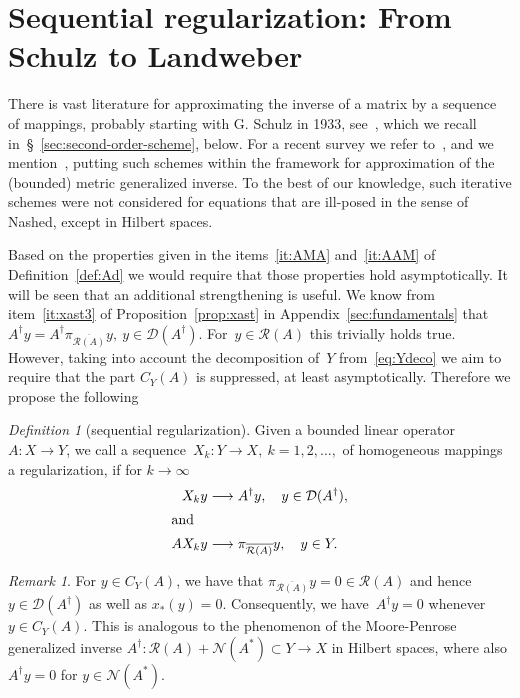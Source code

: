 \documentclass[12pt]{amsart}
\newcommand{\domain}{\mathcal D}
\newcommand{\range}{\mathcal R}
\newcommand{\N}{\mathcal N}
\newcommand{\Ad}{A^\dag}
\newcommand{\xast}{x_\ast}
\newcommand{\pr}{\pi_{\overline{\range(A)}}}
\theoremstyle{remark}
\newtheorem{remark}{Remark}
\newtheorem{definition}{Definition}
\begin{document}
\section{Sequential regularization: From Schulz to Landweber}
\label{sec:regularization}


There is vast literature for approximating the inverse of a matrix by
a sequence of mappings, probably starting with G. Schulz in 1933,
see~\cite{https://doi.org/10.1002/zamm.19330130111}, which we recall
in~\S~\ref{sec:second-order-scheme}, below. For a recent survey we refer to~\cite{MR3969100}, and  we mention~\cite{MR5022356}, putting such schemes within the framework for approximation of the (bounded) metric generalized inverse.
To the best of our knowledge, such iterative
schemes were not considered for equations that are ill-posed in the sense of Nashed, except in Hilbert spaces.
\par
Based on the
properties given in the items~\eqref{it:AMA} and~\eqref{it:AAM} of Definition~\ref{def:Ad} we
would require that those properties hold
asymptotically. It will be seen that an additional strengthening is
useful. We know from item~\eqref{it:xast3} of Proposition~\ref{prop:xast} 
in Appendix~\ref{sec:fundamentals} that~$\Ad y =
\Ad \pr y,\ y\in\domain(\Ad)$. For~$y\in\range(A)$ this trivially
holds true. However, taking into account the decomposition of~$Y$
from~\eqref{eq:Ydeco} we aim to require that the part
$C_Y(A)$ is suppressed, at least asymptotically.
Therefore we propose the following
\begin{definition}[sequential regularization]\label{def:seq-reg}
  Given a bounded linear operator~$A\colon X \to Y$, we call a
  sequence~$X_{k}\colon Y \to X,\ k=1,2,\dots,$  of homogeneous mappings a regularization, if for $k \to \infty$
  \begin{align}
   X_{k}y &\longrightarrow \Ad y,\quad y\in \domain(\Ad)\label{it:VkA},\\
  \intertext{and}  A X_{k}y &\longrightarrow  \pr y,\quad y\in Y\label{it:AVk}.
  \end{align}
\end{definition}

\begin{remark}\label{rem:CYA}
For $y\in C_Y(A)$, we have that $\pr y=0 \in \range(A)$ and hence $y \in \domain(A^\dagger)$ as well as $\xast(y)=0$. Consequently, we have~$\Ad y =0$ whenever~$y\in C_Y(A)$. This is analogous to the phenomenon of the Moore-Penrose generalized inverse 
$\Ad: \range(A)+\N(A^*)\subset Y \to X$ in Hilbert spaces, where also $\Ad y=0$ for $y \in \N(A^*)$. 
\end{remark}
\end{document}
